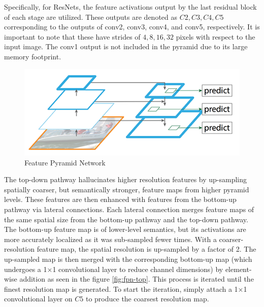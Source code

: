 Specifically, for ResNets, the feature activations output by the last residual block of each stage are utilized. These outputs are denoted as ${C2, C3, C4, C5}$ 
corresponding to the outputs of conv2, conv3, conv4, and conv5, respectively. It is important to note that these have strides of ${4, 8, 16, 32}$ pixels with 
respect to the input image. The conv1 output is not included in the pyramid due to its large memory footprint.

\begin{figure}[h!]
    \centering
    \includegraphics[scale=0.35]{Figures/fpn-base.png}
    \caption{Feature Pyramid Network}
    \label{fig:fpn}
\end{figure}

The top-down pathway hallucinates higher resolution features by up-sampling spatially coarser, but semantically stronger, feature maps from higher pyramid levels. 
These features are then enhanced with features from the bottom-up pathway via lateral connections. Each lateral connection merges feature maps of the same 
spatial size from the bottom-up pathway and the top-down pathway. The bottom-up feature map is of lower-level semantics, but its activations are more accurately 
localized as it was sub-sampled fewer times. With a coarser-resolution feature map, the spatial resolution is up-sampled by a factor of 2. The up-sampled map is 
then merged with the corresponding bottom-up map (which undergoes a 1×1 convolutional layer to reduce channel dimensions) by element-wise addition 
as seen in the figure \ref{fig:fpn-top}. This process is iterated until the finest resolution map is generated. To start the iteration, simply attach a 
1×1 convolutional layer on $C5$ to  produce the coarsest resolution map. 

